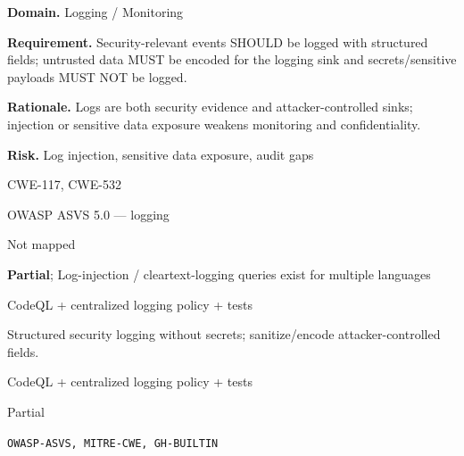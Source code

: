 \documentclass[10pt,letterpaper]{article}
\newcommand{\prioritybadge}[2]{\tcbox[on line,boxrule=0pt,arc=1.2mm,boxsep=0.7mm,left=1mm,right=1mm,top=0.4mm,bottom=0.4mm,colback=#2!12,coltext=#2]{\scriptsize\bfseries #1}}
\begin{document}
\begin{rulebox}[title={\texttt{SCS-ALL-LOG-001} \hfill \prioritybadge{High Priority}{High}}]
\textbf{Domain.} Logging / Monitoring

\textbf{Requirement.} Security-relevant events SHOULD be logged with structured fields; untrusted data MUST be encoded for the logging sink and secrets/sensitive payloads MUST NOT be logged.

\textbf{Rationale.} Logs are both security evidence and attacker-controlled sinks; injection or sensitive data exposure weakens monitoring and confidentiality.

\textbf{Risk.} Log injection, sensitive data exposure, audit gaps

\begin{description}[leftmargin=2.65cm,labelwidth=2.3cm,style=nextline,itemsep=1pt,topsep=3pt]
  \item[CWE] CWE-117, CWE-532
  \item[OWASP] OWASP ASVS 5.0 --- logging
  \item[CERT] Not mapped
  \item[CodeQL] \textbf{Partial}; Log-injection / cleartext-logging queries exist for multiple languages
  \item[Enforcement] CodeQL + centralized logging policy + tests
  \item[Prevention] Structured security logging without secrets; sanitize/encode attacker-controlled fields.
  \item[Verification] CodeQL + centralized logging policy + tests
  \item[Automation] Partial
  \item[Sources] \texttt{OWASP-ASVS, MITRE-CWE, GH-BUILTIN}
\end{description}
\end{rulebox}
\end{document}
